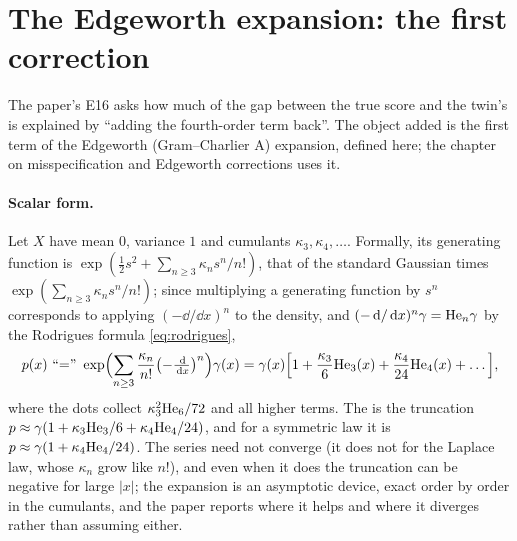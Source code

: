 \section{The Edgeworth expansion: the first correction}
\label{sec:edgeworth}

The paper's E16 asks how much of the gap between the true score and the twin's is
explained by ``adding the fourth-order term back''. The object added is the first
term of the Edgeworth (Gram--Charlier A) expansion, defined here; the chapter on
misspecification and Edgeworth corrections uses it.

\paragraph{Scalar form.}
Let $X$ have mean $0$, variance $1$ and cumulants $\kappa_3,\kappa_4,\dots$. Formally,
its generating function is $\exp(\tfrac12s^2+\sum_{n\ge3}\kappa_ns^n/n!)$, that of the
standard Gaussian times $\exp(\sum_{n\ge3}\kappa_ns^n/n!)$; since multiplying a
generating function by $s^n$ corresponds to applying $(-\dd/\dd x)^n$ to the density,
and $(-\,\mathrm{d}/\,\mathrm{d} x)^n\gamma=\mathrm{He}_{n}\gamma$ by the Rodrigues formula \cref{eq:rodrigues},
\begin{equation}
  p(x)\ \text{``$=$''}\ \exp\Bigl(\sum_{n\ge3}\frac{\kappa_n}{n!}\bigl(-\tfrac{\dd}{\dd x}\bigr)^n\Bigr)\gamma(x)
  =\gamma(x)\Bigl[1+\frac{\kappa_3}{6}\Hen{3}(x)+\frac{\kappa_4}{24}\Hen{4}(x)+\dots\Bigr],
  \label{eq:edgeworth-scalar}
\end{equation}
where the dots collect $\kappa_3^2\mathrm{He}_{6}/72$ and all higher terms. The
 is the truncation
$p\approx\gamma(1+\kappa_3\mathrm{He}_{3}/6+\kappa_4\mathrm{He}_{4}/24)$, and for a symmetric law it
is $p\approx\gamma(1+\kappa_4\mathrm{He}_{4}/24)$. The series need not converge (it does not
for the Laplace law, whose $\kappa_n$ grow like $n!$), and even when it does the
truncation can be negative for large $|x|$; the expansion is an asymptotic device,
exact order by order in the cumulants, and the paper reports where it helps and where
it diverges rather than assuming either.

